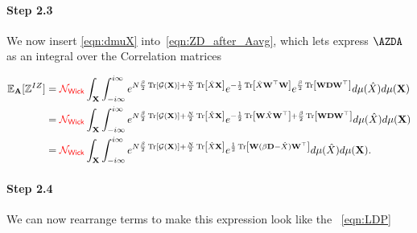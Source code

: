 
\paragraph{Step 2.3}
We now insert \ref{eqn:dmuX} into~\ref{eqn:ZD_after_Aavg},  which lets
express $\AZDA$ as an integral over the \Teacher Correlation matrices

\begin{align}
  \nonumber
  \mathbb{E}_{\mathbf{A}}[\mathbb{Z}^{IZ}]&=
  {\color{red}\sf{\mathcal{N}_{Wick}}} \int_{\mathbf{X}}  \int_{-i\infty}^{i\infty}
  e^{N\frac{\beta}{2} \mbox{}\operatorname{Tr}\left[\mathcal{G}(\mathbf{X})\right]+\frac{N}{2}\mbox{}\operatorname{Tr}\left[\hat{X}\mathbf{X}\right] }
  e^{-\frac{1}{2}\mbox{}\operatorname{Tr}\left[\hat{X}\mathbf{W}^{\top}\mathbf{W}\right]}
  e^{\frac{\beta}{2}\mbox{}\operatorname{Tr}\left[\mathbf{W}\mathbf{D}\mathbf{W}^{\top}\right]}
  d\mu(\hat{X} )
  d\mu(\mathbf{\mathbf{X}}) \\ 
  \nonumber
  &=
  {\color{red}\sf{\mathcal{N}_{Wick}}} \int_{\mathbf{X}}  \int_{-i\infty}^{i\infty}
  e^{N\frac{\beta}{2}\mbox{}\operatorname{Tr}\left[\mathcal{G}(\mathbf{X})\right]+ \frac{N}{2}\mbox{}\operatorname{Tr}\left[\hat{X}\mathbf{X}\right]}
  e^{-\frac{1}{2}\mbox{}\operatorname{Tr}\left[\mathbf{W}\hat{X}\mathbf{W}^{\top}\right]+
  \frac{\beta}{2}\mbox{}\operatorname{Tr}\left[\mathbf{W}\mathbf{D}\mathbf{W}^{\top}\right]}
  d\mu(\hat{X} )
  d\mu(\mathbf{\mathbf{X}}) \\ 
  \label{eqn:ZD3}
    &=
  {\color{red}\sf{\mathcal{N}_{Wick}}} \int_{\mathbf{X}}  \int_{-i\infty}^{i\infty}
  e^{N\frac{\beta}{2}\mbox{}\operatorname{Tr}\left[\mathcal{G}(\mathbf{X})\right]+
  \frac{N}{2}\mbox{}\operatorname{Tr}\left[\hat{X}\mathbf{X}\right]}
  e^{\frac{1}{2}\mbox{}\operatorname{Tr}\left[\mathbf{W}(\beta\mathbf{D}-\hat{X})\mathbf{W}^{\top}\right]}
  d\mu(\hat{X} )
  d\mu(\mathbf{\mathbf{X}})  .
\end{align}

\paragraph{Step 2.4}
We can now rearrange terms to make this expression look like the \EQN~\ref{eqn:LDP}


